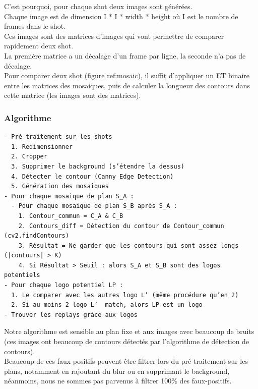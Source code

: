 \documentclass[11pt]{article}
\begin{document}
C'est pourquoi, pour chaque shot deux images sont générées.\\

Chaque image est de dimension I * I * width * height où I est le nombre de frames dans le shot.\\

Ces images sont des matrices d'images qui vont permettre de comparer rapidement deux shot.\\
La première matrice a un décalage d'un frame par ligne, la seconde n'a pas de décalage.\\

Pour comparer deux shot (figure ref:mosaic), il suffit d’appliquer un ET binaire entre les matrices des mosaiques, puis de calculer la longueur des contours dans cette matrice (les images sont des matrices).\\

\subsubsection{Algorithme}
\label{sec:orgcc2333e}
\begin{verbatim}
- Pré traitement sur les shots
  1. Redimensionner
  2. Cropper
  3. Supprimer le background (s’étendre la dessus)
  4. Détecter le contour (Canny Edge Detection)
  5. Génération des mosaiques
- Pour chaque mosaique de plan S_A :
  - Pour chaque mosaique de plan S_B après S_A :
    1. Contour_commun = C_A & C_B
    2. Contours_diff = Détection du contour de Contour_commun (cv2.findContours)
    3. Résultat = Ne garder que les contours qui sont assez longs (|contours| > K)
    4. Si Résultat > Seuil : alors S_A et S_B sont des logos potentiels
- Pour chaque logo potentiel LP :
  1. Le comparer avec les autres logo L’ (même procédure qu’en 2)
  2. Si au moins 2 logo L’  match, alors LP est un logo
- Trouver les replays grâce aux logos
\end{verbatim}

Notre algorithme est sensible au plan fixe et aux images avec beaucoup de bruits (ces images ont beaucoup de contours détectés par l’algorithme de détection de contours).\\
Beaucoup de ces faux-positifs peuvent être filtrer lors du pré-traitement sur les plans, notamment en rajoutant du blur ou en supprimant le background, néanmoins, nous ne sommes pas parvenus à filtrer 100\% des faux-positifs.\\
\end{document}
